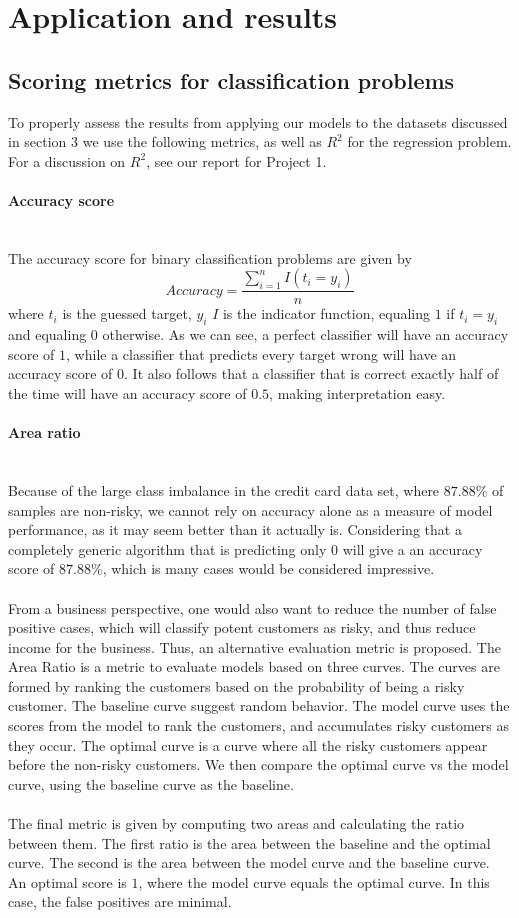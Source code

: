 \documentclass[10pt, a4paper, twocolumn]{article}
\newcommand{\myparagraph}[1]{\paragraph{#1}\mbox{}\\}
\begin{document}
\section{Application and results}
	\subsection{Scoring metrics for classification problems}
		To properly assess the results from applying our models to the datasets discussed in section 3 we use the following metrics, as well as $R^2$ for the regression problem. For a discussion on $R^2$, see our report for Project 1\cite{Project1}.
		\myparagraph{Accuracy score}
			The accuracy score for binary classification problems are given by
				$$Accuracy=\frac{\sum_{i=1}^nI(t_i=y_i)}{n}$$
			where $t_i$ is the guessed target, $y_i$ $I$ is the indicator function, equaling $1$ if $t_i=y_i$ and equaling $0$ otherwise.
			As we can see, a perfect classifier will have an accuracy score of $1$, while a classifier that predicts every target wrong will have an accuracy score of $0$. It also follows that a classifier that is correct exactly half of the time will have an accuracy score of $0.5$, making interpretation easy.
		\myparagraph{Area ratio}
			Because of the large class imbalance in the credit card data set, where $87.88\%$ of samples are non-risky, we cannot rely on accuracy alone as a measure of model performance, as it may seem better than it actually is. Considering that a completely generic algorithm that is predicting only $0$ will give a an accuracy score of $87.88\%$, which is many cases would be considered impressive. \\\\
			From a business perspective, one would also want to reduce the number of false positive cases, which will classify potent customers as risky, and thus reduce income for the business. Thus, an alternative evaluation metric is proposed. The Area Ratio is a metric to evaluate models based on three curves. The curves are formed by ranking the customers based on the probability of being a risky customer. The baseline curve suggest random behavior. The model curve uses the scores from the model to rank the customers, and accumulates risky customers as they occur. The optimal curve is a curve where all the risky customers appear before the non-risky customers. We then compare the optimal curve vs the model curve, using the baseline curve as the baseline.\\\\ 
			The final metric is given by computing two areas and calculating the ratio between them. The first ratio is the area between the baseline and the optimal curve. The second is the area between the model curve and the baseline curve. An optimal score is $1$, where the model curve equals the optimal curve. In this case, the false positives are minimal.
					
\end{document}
